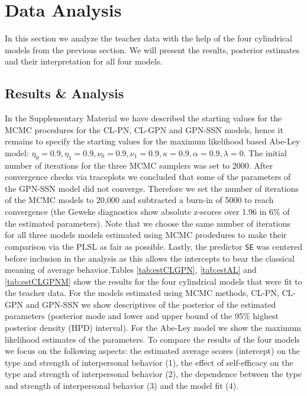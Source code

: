 \documentclass[man]{apa6}
\theoremstyle{definition}
\theoremstyle{definition}
\theoremstyle{definition}
\theoremstyle{remark}
\begin{document}
\section{Data Analysis}\label{DataAnalysis}

In this section we analyze the teacher data with the help of the four
cylindrical models from the previous section. We will present the
results, posterior estimates and their interpretation for all four
models.

\subsection{Results \& Analysis}\label{DataResults}

In the Supplementary Material we have described the starting values for
the MCMC procedures for the CL-PN, CL-GPN and GPN-SSN models, hence it
remains to specify the starting values for the maximum likelihood based
Abe-Ley model:
\(\eta_0 = 0.9, \eta_1 = 0.9, \nu_0 = 0.9, \nu_1 = 0.9, \kappa = 0.9, \alpha = 0.9, \lambda = 0\).
The initial number of iterations for the three MCMC samplers was set to
2000. After convergence checks via traceplots we concluded that some of
the parameters of the GPN-SSN model did not converge. Therefore we set
the number of iterations of the MCMC models to 20,000 and subtracted a
burn-in of 5000 to reach convergence (the Geweke diagnostics show
absolute z-scores over 1.96 in 6\% of the estimated parameters). Note
that we choose the same number of iterations for all three models models
estimated using MCMC prodedures to make their comparison via the PLSL as
fair as possible. Lastly, the predictor \verb|SE| was centered before
inclusion in the analysis as this allows the intercepts to bear the
classical meaning of average behavior.\newline \indent Tables
\ref{tab:estCLGPN}, \ref{tab:estAL} and \ref{tab:estCLGPNM} show the
results for the four cylindrical models that were fit to the teacher
data. For the models estimated using MCMC methods, CL-PN, CL-GPN and
GPN-SSN we show descriptives of the posterior of the estimated
parameters (posterior mode and lower and upper bound of the 95\% highest
posterior density (HPD) interval). For the Abe-Ley model we show the
maximum likelihood estimates of the parameters. To compare the results
of the four models we focus on the following aspects: the estimated
average scores (intercept) on the type and strength of interpersonal
behavior (1), the effect of self-efficacy on the type and strength of
interpersonal behavior (2), the dependence between the type and strength
of interpersonal behavior (3) and the model fit (4).
\end{document}
